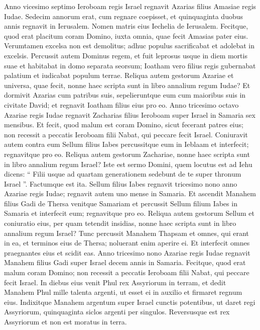 \begin{biblechapter}
\begin{biblechapter}
\begin{biblechapter}
\begin{biblechapter}
\begin{biblechapter}
\begin{biblechapter}
\begin{biblechapter}
\begin{biblechapter}
\begin{biblechapter}
\begin{biblechapter}
\begin{biblechapter}
\begin{biblechapter}
\begin{biblechapter}
\begin{biblechapter}
\begin{biblechapter}
 \verse Anno vicesimo septimo Ieroboam regis Israel regnavit Azarias filius Amasiae regis Iudae. 
\verse Sedecim annorum erat, cum regnare coepisset, et quinquaginta duobus annis regnavit in Ierusalem. Nomen matris eius Iechelia de Ierusalem. 
 \verse Fecitque, quod erat placitum coram Domino, iuxta omnia, quae fecit Amasias pater eius. 
\verse Verumtamen excelsa non est demolitus; adhuc populus sacrificabat et adolebat in excelsis. 
\verse Percussit autem Dominus regem, et fuit leprosus usque in diem mortis suae et habitabat in domo separata seorsum; Ioatham vero filius regis gubernabat palatium et iudicabat populum terrae.
 \verse Reliqua autem gestorum Azariae et universa, quae fecit, nonne haec scripta sunt in libro annalium regum Iudae? 
\verse Et dormivit Azarias cum patribus suis, sepelieruntque eum cum maioribus suis in civitate David; et regnavit Ioatham filius eius pro eo.
 \verse Anno tricesimo octavo Azariae regis Iudae regnavit Zacharias filius Ieroboam super Israel in Samaria sex mensibus. 
\verse Et fecit, quod malum est coram Domino, sicut fecerant patres eius; non recessit a peccatis Ieroboam filii Nabat, qui peccare fecit Israel. 
\verse Coniuravit autem contra eum Sellum filius Iabes percussitque eum in Ieblaam et interfecit; regnavitque pro eo.
 \verse Reliqua autem gestorum Zachariae, nonne haec scripta sunt in libro annalium regum Israel? 
\verse Iste est sermo Domini, quem locutus est ad Iehu dicens: “ Filii usque ad quartam generationem sedebunt de te super thronum Israel ”. Factumque est ita.
 \verse Sellum filius Iabes regnavit tricesimo nono anno Azariae regis Iudae; regnavit autem uno mense in Samaria. 
\verse Et ascendit Manahem filius Gadi de Thersa venitque Samariam et percussit Sellum filium Iabes in Samaria et interfecit eum; regnavitque pro eo.
 \verse Reliqua autem gestorum Sellum et coniuratio eius, per quam tetendit insidias, nonne haec scripta sunt in libro annalium regum Israel?
 \verse Tunc percussit Manahem Thapsam et omnes, qui erant in ea, et terminos eius de Thersa; noluerant enim aperire ei. Et interfecit omnes praegnantes eius et scidit eas.
 \verse Anno tricesimo nono Azariae regis Iudae regnavit Manahem filius Gadi super Israel decem annis in Samaria. 
\verse Fecitque, quod erat malum coram Domino; non recessit a peccatis Ieroboam filii Nabat, qui peccare fecit Israel. In diebus eius 
\verse venit Phul rex Assyriorum in terram, et dedit Manahem Phul mille talenta argenti, ut esset ei in auxilio et firmaret regnum eius. 
\verse Indixitque Manahem argentum super Israel cunctis potentibus, ut daret regi Assyriorum, quinquaginta siclos argenti per singulos. Reversusque est rex Assyriorum et non est moratus in terra.

\end{biblechapter}
\end{biblechapter}
\end{biblechapter}
\end{biblechapter}
\end{biblechapter}
\end{biblechapter}
\end{biblechapter}
\end{biblechapter}
\end{biblechapter}
\end{biblechapter}
\end{biblechapter}
\end{biblechapter}
\end{biblechapter}
\end{biblechapter}
\end{biblechapter}
